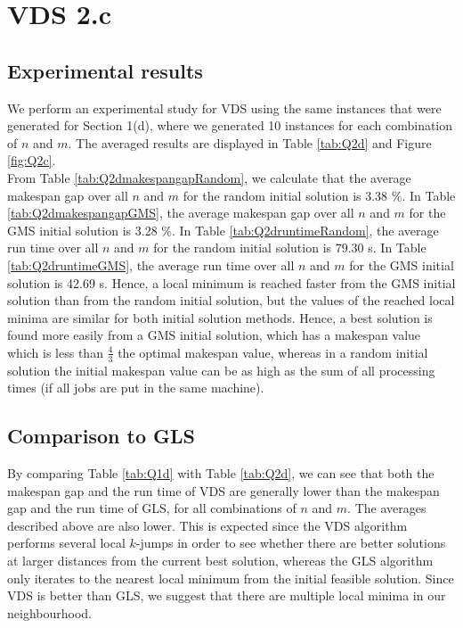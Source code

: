 \documentclass[12pt,a4paper,reqno]{article}
\begin{document}
\section*{VDS 2.c}
\subsection*{Experimental results}
We perform an experimental study for VDS using the same instances that were generated for Section 1(d), where we generated 10 instances for each combination of $n$ and $m$. The averaged results are displayed in Table \ref{tab:Q2d} and Figure \ref{fig:Q2c}. \\

From Table \ref{tab:Q2dmakespangapRandom}, we calculate that the average makespan gap over all $n$ and $m$ for the random initial solution is 3.38 \%. In Table \ref{tab:Q2dmakespangapGMS}, the average makespan gap over all $n$ and $m$ for the GMS initial solution is 3.28 \%. In Table \ref{tab:Q2druntimeRandom}, the average run time over all $n$ and $m$ for the random initial solution is 79.30 s. In Table \ref{tab:Q2druntimeGMS}, the average run time over all $n$ and $m$ for the GMS initial solution is 42.69 s. Hence, a local minimum is reached faster from the GMS initial solution than from the random initial solution, but the values of the reached local minima are similar for both initial solution methods. Hence, a best solution is found more easily from a GMS initial solution, which has a makespan value which is less than $\frac{4}{3}$ the optimal makespan value, whereas in a random initial solution the initial makespan value can be as high as the sum of all processing times (if all jobs are put in the same machine). 

\subsection*{Comparison to GLS}
By comparing Table \ref{tab:Q1d} with Table \ref{tab:Q2d}, we can see that both the makespan gap and the run time of VDS are generally lower than the makespan gap and the run time of GLS, for all combinations of $n$ and $m$. The averages described above are also lower. This is expected since the VDS algorithm performs several local $k$-jumps in order to see whether there are better solutions at larger distances from the current best solution, whereas the GLS algorithm only iterates to the nearest local minimum from the initial feasible solution. Since VDS is better than GLS, we suggest that there are multiple local minima in our neighbourhood. \\
\end{document}
